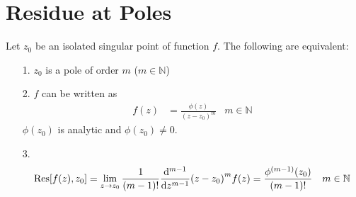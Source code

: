 \documentclass[12pt, english]{book}
\begin{document}
	\section{Residue at Poles} \label{Residue at Poles Section - Complex}
	
	\begin{theorem}
		\label{Residue at Poles Theorem - Complex}
		Let \(z_0\) be an isolated singular point of function \(f\). The following are equivalent: 
		\begin{itemize}
			\item[1.] \(z_0\) is a pole of order \(m\) (\(m \in \mathbb{N}\))
			\item[2.] \(f\) can be written as 
				\begin{align*}
					f(z) &= \frac{\phi(z)}{(z-z_0)^m}	&	m \in \mathbb{N}
				\end{align*}
				\(\phi(z_0)\) is analytic and \(\phi(z_0) \neq 0\).
			\item[3.]
			\begin{align*}
				\Res[f(z), z_0] 
				&= \lim_{z \rightarrow z_0} \frac{1}{(m-1)!} \dv[m-1]{z} (z-z_0)^m f(z)
				 = \frac{\phi^{(m-1)}(z_0)}{(m-1)!}	&	m \in \mathbb{N}
			\end{align*}
		\end{itemize}
	\end{theorem}
\end{document}
